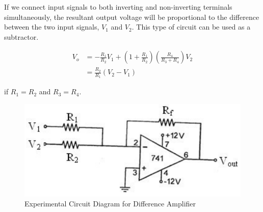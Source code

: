 If we connect input signals to both inverting and non-inverting terminals simultaneously, the resultant output voltage will be proportional to the difference between the two input signals, $V_1$ and $V_2$. This type of circuit can be used as a subtractor.

\begin{align}
    V_o &= -\frac{R_1}{R_2}V_1 + \left(1+\frac{R_1}{R_2}\right)\left(\frac{R_4}{R_3+R_4}\right)V_2 \nonumber \\
    &= \frac{R_2}{R_1}(V_2-V_1)
\end{align}

if $R_1 = R_2$ and $ R_3 = R_4$.




\begin{figure}[H]
    \centering
    \includegraphics[width=0.8\columnwidth]{images/sum2.png}
    \caption{Experimental Circuit Diagram for Difference Amplifier}
    \label{diff2}
\end{figure}
